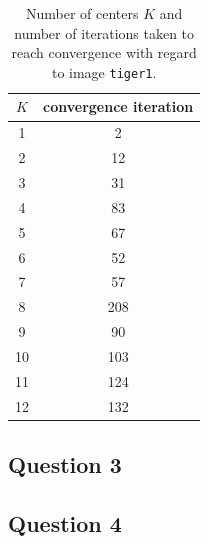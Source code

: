 \begin{table}[H]
{{\begin{minipage}[b]{0.45\hsize}
\begin{tabular}{c|c}
      $K$ & convergence iteration \\ \hline
      1                 & 2                     \\
      2                 & 12                    \\
      3                 & 31                    \\
      4                 & 83                    \\
      5                 & 67                    \\
      6                 & 52                    \\
      7                 & 57                    \\
      8                 & 208                   \\
      9                 & 90                    \\
      10                & 103                   \\
      11                & 124                   \\
      12                & 132                   \\
    \end{tabular}
    \caption{Number of centers $K$ and number of iterations taken to reach
      convergence with regard to image \texttt{tiger1}.}
    \label{tab:convergence_tiger}
  \end{minipage}
}}
\end{table}


\subsection{Question 3}

\subsection{Question 4}
